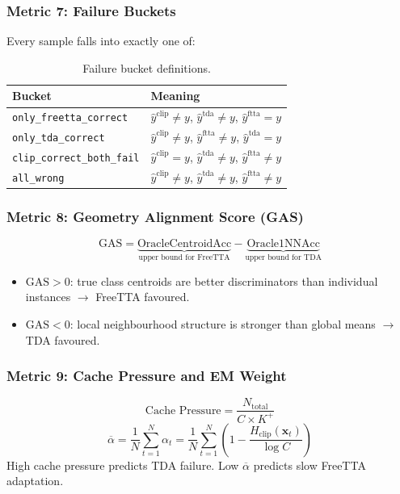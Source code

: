 \documentclass[12pt,a4paper]{article}
\newcommand{\bx}{\mathbf{x}}
\newcommand{\1}{\mathbf{1}}
\begin{document}
\subsubsection{Metric 7: Failure Buckets}

Every sample falls into exactly one of:

\begin{table}[H]
\centering
\caption{Failure bucket definitions.}
\label{tab:buckets_def}
\begin{tabular}{@{}ll@{}}
\toprule
Bucket & Meaning \\
\midrule
\texttt{only\_freetta\_correct}    & $\hat{y}^{\text{clip}} \neq y$, $\hat{y}^{\text{tda}} \neq y$, $\hat{y}^{\text{ftta}} = y$ \\
\texttt{only\_tda\_correct}        & $\hat{y}^{\text{clip}} \neq y$, $\hat{y}^{\text{ftta}} \neq y$, $\hat{y}^{\text{tda}} = y$ \\
\texttt{clip\_correct\_both\_fail} & $\hat{y}^{\text{clip}} = y$, $\hat{y}^{\text{tda}} \neq y$, $\hat{y}^{\text{ftta}} \neq y$ \\
\texttt{all\_wrong}                & $\hat{y}^{\text{clip}} \neq y$, $\hat{y}^{\text{tda}} \neq y$, $\hat{y}^{\text{ftta}} \neq y$ \\
\bottomrule
\end{tabular}
\end{table}

\subsubsection{Metric 8: Geometry Alignment Score (GAS)}
\begin{equation}
  \text{GAS} = \underbrace{\text{OracleCentroidAcc}}_{\text{upper bound for FreeTTA}} - \underbrace{\text{Oracle1NNAcc}}_{\text{upper bound for TDA}}
  \label{eq:gas}
\end{equation}
\begin{itemize}[noitemsep]
  \item $\text{GAS} > 0$: true class centroids are better discriminators than individual instances $\to$ FreeTTA favoured.
  \item $\text{GAS} < 0$: local neighbourhood structure is stronger than global means $\to$ TDA favoured.
\end{itemize}

\subsubsection{Metric 9: Cache Pressure and EM Weight}
\begin{equation}
  \text{Cache Pressure} = \frac{N_{\text{total}}}{C \times K^+}
  \label{eq:cache_pressure}
\end{equation}
\begin{equation}
  \overline{\alpha} = \frac{1}{N}\sum_{t=1}^N \alpha_t = \frac{1}{N}\sum_{t=1}^N \left(1 - \frac{H_{\text{clip}}(\bx_t)}{\log C}\right)
  \label{eq:em_weight}
\end{equation}
High cache pressure predicts TDA failure.
Low $\overline{\alpha}$ predicts slow FreeTTA adaptation.
\end{document}

